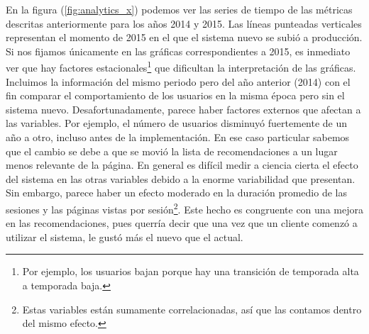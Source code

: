 \documentclass[12pt]{report}
\begin{document}
En la figura (\ref{fig:analytics_x}) podemos ver las series de tiempo de las métricas descritas anteriormente para los años 2014 y 2015. Las líneas punteadas verticales representan el momento de 2015 en el que el sistema nuevo se subió a producción. Si nos fijamos únicamente en las gráficas correspondientes a 2015, es inmediato ver que hay factores estacionales\footnote{Por ejemplo, los usuarios bajan porque hay una transición de temporada alta a temporada baja.} que dificultan la interpretación de las gráficas. Incluimos la información del mismo periodo pero del año anterior (2014) con el fin comparar el comportamiento de los usuarios en la misma época pero sin el sistema nuevo. Desafortunadamente, parece haber factores externos que afectan a las variables. Por ejemplo, el número de usuarios disminuyó fuertemente de un año a otro, incluso antes de la implementación. En ese caso particular sabemos que el cambio se debe a que se movió la lista de recomendaciones a un lugar menos relevante de la página. En general es difícil medir a ciencia cierta el efecto del sistema en las otras variables debido a la enorme variabilidad que presentan. Sin embargo, parece haber un efecto moderado en la duración promedio de las sesiones y las páginas vistas por sesión\footnote{Estas variables están sumamente correlacionadas, así que las contamos dentro del mismo efecto.}. Este hecho es congruente con una mejora en las recomendaciones, pues querría decir que una vez que un cliente comenzó a utilizar el sistema, le gustó más el nuevo que el actual.
\end{document}
